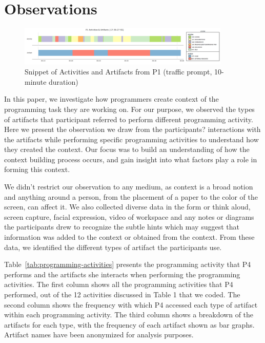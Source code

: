 
\section{Observations}


\vspace{-6pt}
\begin{figure}
\includegraphics[width=0.9\textwidth]{figures/P1timeplot}
\caption{Snippet of Activities and Artifacts from P1 (traffic prompt, 10-minute duration)}
\end{figure}

In this paper, we investigate how programmers create context of the programming task they are working on. For our purpose, we observed the types of artifacts that participant referred to perform different programming activity. Here we present the observation we draw from the participants? interactions with the artifacts while performing specific programming activities to understand how they created the context. Our focus was to build an understanding of how the context building process occurs, and gain insight into what factors play a role in forming this context. 

We didn't restrict our observation to any medium, as context is a broad notion and anything around a person, from the placement of a paper to the color of the screen, can affect it. We also collected diverse data in the form or think aloud, screen capture, facial expression, video of workspace and any notes or diagrams the participants drew to recognize the subtle hints which may suggest that information was added to the context or obtained from the context. From these data, we identified the different types of artifact the participants use. 

Table~\ref{tab:programming-activities} presents the programming activity that P4 performs and the artifacts she interacts when performing the programming activities. The first column shows all the programming activities that P4 performed, out of the 12 activities discussed in Table 1 that we coded. The second column shows the frequency with which P4 accessed each type of artifact within each programming activity. The third column shows a breakdown of the artifacts for each type, with the frequency of each artifact shown as bar graphs. Artifact names have been anonymized for analysis purposes. 

